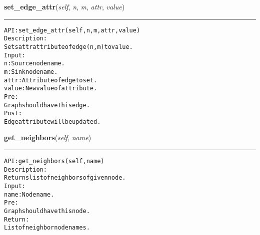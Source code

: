     \label{coinor:gimpy:graph:Graph:set_edge_attr}

    \vspace{0.5ex}

\hspace{.8\funcindent}\begin{boxedminipage}{\funcwidth}

    \raggedright \textbf{set\_edge\_attr}(\textit{self}, \textit{n}, \textit{m}, \textit{attr}, \textit{value})

    \vspace{-1.5ex}

    \rule{\textwidth}{0.5\fboxrule}
\setlength{\parskip}{2ex}
\begin{alltt}

API: set\_edge\_attr(self, n, m, attr, value)
Description:
Sets attr attribute of edge (n,m) to value.
Input:
    n: Source node name.
    m: Sink node name.
    attr: Attribute of edge to set.
    value: New value of attribute.
Pre:
    Graph should have this edge.
Post:
    Edge attribute will be updated.
\end{alltt}

\setlength{\parskip}{1ex}
    \end{boxedminipage}

    \label{coinor:gimpy:graph:Graph:get_neighbors}

    \vspace{0.5ex}

\hspace{.8\funcindent}\begin{boxedminipage}{\funcwidth}

    \raggedright \textbf{get\_neighbors}(\textit{self}, \textit{name})

    \vspace{-1.5ex}

    \rule{\textwidth}{0.5\fboxrule}
\setlength{\parskip}{2ex}
\begin{alltt}

API: get\_neighbors(self, name)
Description:
Returns list of neighbors of given node.
Input:
    name: Node name.
Pre:
    Graph should have this node.
Return:
    List of neighbor node names.
\end{alltt}

\setlength{\parskip}{1ex}
    \end{boxedminipage}

